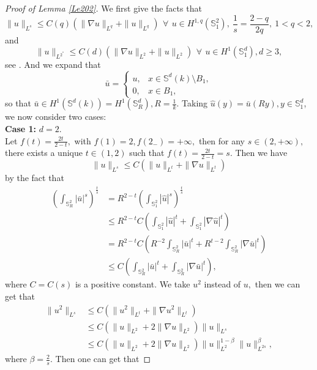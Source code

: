 \documentclass[reqno]{amsart}
\numberwithin{equation}{section}
\newenvironment{key words}{\textbf{Keywords}\mbox{  }}{ }
\begin{document}
\begin{proof}[Proof of Lemma \ref{Le202}]
	We first give the facts that
	\[\|u\|_{L^{s}}\leq C(q)\left(\|\nabla u\|_{L^{q}}+\|u\|_{L^{q}}\right) \,\ \forall\,\ u\in H^{1,q}(\mathbb{S}_{1}^{2}),~\frac{1}{s}=\frac{2-q}{2q},~1<q<2,\]
	and
	\[\|u\|_{L^{2^{\ast}}}\leq C(d)\left(\|\nabla u\|_{L^{2}}+\|u\|_{L^{2}}\right) \,\ \forall\,\ u\in H^{1}(\mathbb{S}_{1}^{d}),d\geq3, \]
	see \cite{A98,B93}. And we expand that
	\begin{equation*}
		\bar{u}=
		\begin{cases}
			u, &x \in \mathbb{S}^{d}(k)\setminus B_{1},\\
			0, &x \in B_{1},
		\end{cases}
	\end{equation*}
	so that $\bar{u}\in H^{1}(\mathbb{S}^{d}(k))=H^{1}(\mathbb{S}_{R}^{d}),R=\frac{1}{k}.$ Taking $\hat{u}(y)=\bar{u}(Ry),y\in \mathbb{S}_{1}^{d}$, we now consider two cases:\\
	\textbf{Case 1:} $d=2.$\\
	Let $f(t)=\frac{2t}{2-t},$ with $f(1)=2,f(2_{-})=+\infty,$ then for any $s\in(2,+\infty),$ there exists a unique $t\in(1,2)$ such that $f(t)=\frac{2t}{2-t}=s.$
	Then we have
	\[\|u\|_{L^{s}}\leq C(\|u\|_{L^{t}}+\|\nabla u\|_{L^{t}})\]
	by the fact that
	\begin{align*}
		\left(\int_{\mathbb{S}_{R}^{2}}|\bar{u}|^{s}\right)^{\frac{t}{s}}&= R^{2-t}\left(\int_{\mathbb{S}_{1}^{2}}|\hat{u}|^{s}\right)^{\frac{t}{s}} \\
		&\leq R^{2-t}C\left(\int_{\mathbb{S}_{1}^{2}}|\hat{u}|^{t}+\int_{\mathbb{S}_{1}^{2}}|\nabla \hat{u}|^{t}\right)\\
		&= R^{2-t}C\left(R^{-2}\int_{\mathbb{S}_{R}^{2}}|\bar{u}|^{t}+R^{t-2}\int_{\mathbb{S}_{R}^{2}}|\nabla \bar{u}|^{t}\right)\\
		&\leq C\left(\int_{\mathbb{S}_{R}^{2}}|\bar{u}|^{t}+\int_{\mathbb{S}_{R}^{2}}|\nabla \bar{u}|^{t}\right),
	\end{align*}
	where $C=C(s)$ is a positive constant. We take $u^{2}$ instead of $u,$ then we can get that
	\begin{align*}
		\|u^{2}\|_{L^{s}}&\leq C(\|u^{2}\|_{L^{t}}+\|\nabla u^{2}\|_{L^{t}})\\
		&\leq C(\|u\|_{L^{2}}+2\|\nabla u\|_{L^{2}})\|u\|_{L^{s}}\\
		&\leq C(\|u\|_{L^{2}}+2\|\nabla u\|_{L^{2}})\|u\|^{1-\beta}_{L^{2}}\|u\|^{\beta}_{L^{2s}},
	\end{align*}
	where $\beta=\frac{2}{s}.$ Then one can get that

\end{proof}
\end{document}
